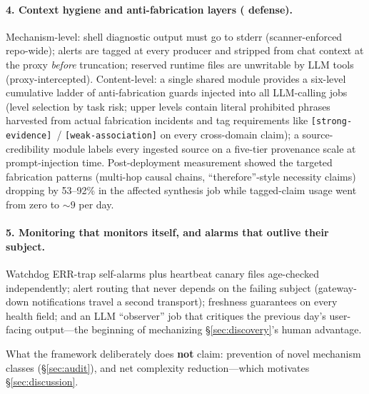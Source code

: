 \paragraph{4. Context hygiene and anti-fabrication layers (
defense).}
Mechanism-level: shell diagnostic output must go to stderr
(scanner-enforced repo-wide); alerts are tagged at every producer and
stripped from chat context at the proxy \emph{before} truncation;
reserved runtime files are unwritable by LLM tools (proxy-intercepted).
Content-level: a single shared module provides a six-level cumulative
ladder of anti-fabrication guards injected into all LLM-calling jobs
(level selection by task risk; upper levels contain literal prohibited
phrases harvested from actual fabrication incidents and tag requirements
like \texttt{[strong-evidence]}~/ \texttt{[weak-association]} on every
cross-domain claim); a source-credibility module labels every ingested
source on a five-tier provenance scale at prompt-injection time.
Post-deployment measurement showed the targeted fabrication patterns
(multi-hop causal chains, ``therefore''-style necessity claims) dropping
by 53--92\% in the affected synthesis job while tagged-claim usage went
from zero to ${\sim}9$ per day.

\paragraph{5. Monitoring that monitors itself, and alarms that outlive
their subject.}
Watchdog ERR-trap self-alarms plus heartbeat canary files age-checked
independently; alert routing that never depends on the failing subject
(gateway-down notifications travel a second transport); freshness
guarantees on every health field; and an LLM ``observer'' job that
critiques the previous day's user-facing output---the beginning of
mechanizing \S\ref{sec:discovery}'s human advantage.

\medskip
What the framework deliberately does \textbf{not} claim: prevention of
novel mechanism classes (\S\ref{sec:audit}), and net complexity
reduction---which motivates \S\ref{sec:discussion}.
